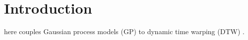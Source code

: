 \section{Introduction}
\label{intro}
here couples Gaussian process models (GP) \cite{rasmussen2006gaussian} to 
dynamic time warping (DTW) \cite{muller}.
